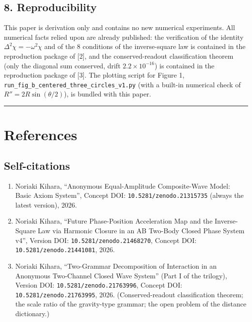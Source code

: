 \documentclass[
  a4paper,
]{article}
\providecommand{\tightlist}{%
  \setlength{\itemsep}{0pt}\setlength{\parskip}{0pt}}
\begin{document}
\subsection{8. Reproducibility}\label{reproducibility}

This paper is derivation only and contains no new numerical experiments.
All numerical facts relied upon are already published: the verification
of the identity \(\Delta^2\chi=-\omega^2\chi\) and of the 8 conditions
of the inverse-square law is contained in the reproduction package of
{[}2{]}, and the conserved-readout classification theorem (only the
diagonal sum conserved, drift \(2.2\times10^{-16}\)) is contained in the
reproduction package of {[}3{]}. The plotting script for Figure 1,
\texttt{run\_fig\_b\_centered\_three\_circles\_v1.py} (with a built-in
numerical check of \(R''=2R\sin(\theta/2)\)), is bundled with this
paper.

\begin{center}\rule{0.5\linewidth}{0.5pt}\end{center}

\section{References}\label{references}

\subsection{Self-citations}\label{self-citations}

\begin{enumerate}
\def\labelenumi{\arabic{enumi}.}
\tightlist
\item
  Noriaki Kihara, ``Anonymous Equal-Amplitude Composite-Wave Model:
  Basic Axiom System'', Concept DOI: \texttt{10.5281/zenodo.21315735}
  (always the latest version), 2026.
\item
  Noriaki Kihara, ``Future Phase-Position Acceleration Map and the
  Inverse-Square Law via Harmonic Closure in an AB Two-Body Closed Phase
  System v4'', Version DOI: \texttt{10.5281/zenodo.21468270}, Concept
  DOI: \texttt{10.5281/zenodo.21441081}, 2026.
\item
  Noriaki Kihara, ``Two-Grammar Decomposition of Interaction in an
  Anonymous Two-Channel Closed Wave System'' (Part I of the trilogy),
  Version DOI: \texttt{10.5281/zenodo.21763996}, Concept DOI:
  \texttt{10.5281/zenodo.21763995}, 2026. (Conserved-readout
  classification theorem; the scale ratio of the gravity-type grammar;
  the open problem of the distance dictionary.)
\end{enumerate}
\end{document}
